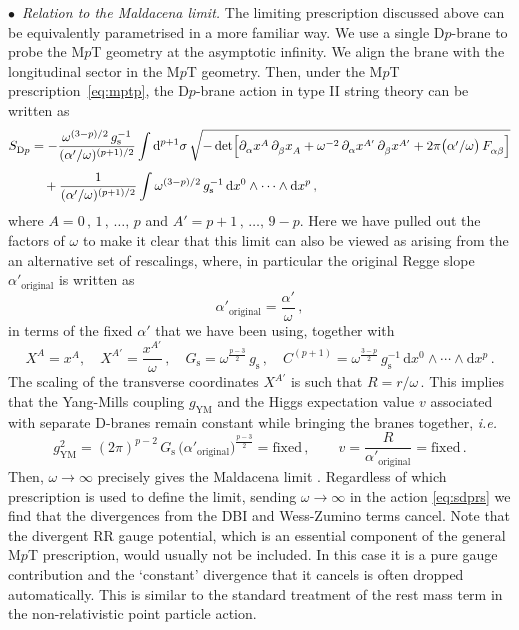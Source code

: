 \documentclass[11pt]{article}
\newcommand{\be}{\begin{equation}}
\newcommand{\ee}{\end{equation}}
\newcommand{\p}{\partial}
\renewcommand{\emph}[1]{\textit{#1}}
\newcommand{\dd}{\mathrm{d}}
\begin{document}
\noindent $\bullet$~\emph{Relation to the Maldacena limit.}
The limiting prescription discussed above can be equivalently parametrised in a more familiar way. We use a single D$p$-brane to probe the M$p$T geometry at the asymptotic infinity. We align the brane with the longitudinal sector in the M$p$T geometry. Then, under the M$p$T prescription~\eqref{eq:mptp}, the D$p$-brane action in type II string theory can be written as
%
\begin{align} \label{eq:sdprs}
    S^{}_\text{D$p$} & = - \frac{\omega^{(3-p)/2} \, g^{-1}_\text{s}}{(\alpha' / \omega)^{(p+1)/2}} \int \dd^{p+1} \sigma \, \sqrt{- \det \Bigl[ \p^{}_\alpha x^A \, \p^{}_\beta x^{}_A + \omega^{-2} \, \p^{}_\alpha x^{A'} \, \p^{}_\beta x^{A'} + 2 \pi \bigl( \alpha' / \omega \bigr) \, F^{}_{\alpha\beta} \Bigr]} \notag \\[4pt]
    & \quad + \frac{1}{(\alpha' / \omega)^{(p+1)/2}} \int \omega^{(3-p)/2} \, g^{-1}_\text{s} \, \dd x^0 \wedge \cdots \wedge \dd x^p\,,
\end{align}
%
where $A=0\,,\,1\,, \, \dots, \, p$ and $A'= p+1\,,\,\dots,\, 9-p$.
Here we have pulled out the factors of $\omega$ to make it clear that this limit can also be viewed as arising from the an alternative set of rescalings, where, in particular the original Regge slope $\alpha'_\text{original}$ is written as 
\be \label{eq:alphapr}
    \alpha'_\text{original} = \frac{\alpha'}{\omega}\,,    
\ee
in terms of the fixed $\alpha'$ that we have been using, together with
%
\be
    X^A = x^A,
        \quad%
    X^{A'} = \frac{x^{A'}}{\omega}\,,
        \quad%
    G^{}_\text{s} = \omega^{\frac{p-3}{2}} \, g^{}_\text{s}\,,
        \quad%
    C^{(p+1)} = \omega^{\frac{3-p}{2}} \, g^{-1}_\text{s} \, \dd x^0 \wedge \cdots \wedge \dd x^p\,.
\ee
%
The scaling of the transverse coordinates $X^{A'}$ is such that $R = r / \omega$\,.
This implies that the Yang-Mills coupling $g^{}_\text{YM}$ and the Higgs expectation value $v$ associated with separate D-branes remain constant while bringing the branes together, \emph{i.e.}
%
\be
    g^2_\text{YM} = (2\pi)^{p-2} \, G^{}_\text{s} \, \bigl( \alpha'_\text{original}
     \bigr)^{\frac{p-3}{2}} = \text{fixed}\,,
        \qquad%
    v = \frac{R}{\alpha'_\text{original}} = \text{fixed}\,.
\ee
%
Then, $\omega \rightarrow \infty$ precisely gives the Maldacena limit \cite{Maldacena:1997re, Itzhaki:1998dd}. 
Regardless of which prescription is used to define the limit, sending $\omega\to\infty$ in the action \eqref{eq:sdprs} we find that the divergences from the DBI and Wess-Zumino terms cancel. 
Note that the divergent RR gauge potential, which is an essential component of the general M$p$T prescription, would usually not be included. In this case it is a pure gauge contribution and the `constant' divergence that it cancels is often dropped automatically. This is similar to the standard treatment of the rest mass term in the non-relativistic point particle action.
\end{document}
